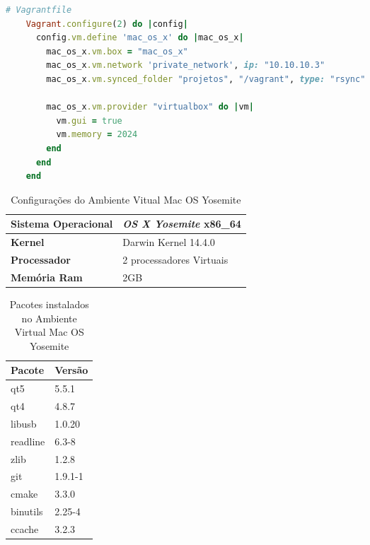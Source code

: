 \begin{itemize}
\begin{lstlisting}[language=ruby, caption={Vagrantfile com configurações da máquina virtual Mac OS Yosemite},
                  label=vagrant_mac_os_x]
    # Vagrantfile
    Vagrant.configure(2) do |config|
      config.vm.define 'mac_os_x' do |mac_os_x|
        mac_os_x.vm.box = "mac_os_x"
        mac_os_x.vm.network 'private_network', ip: "10.10.10.3"
        mac_os_x.vm.synced_folder "projetos", "/vagrant", type: "rsync"

        mac_os_x.vm.provider "virtualbox" do |vm|
          vm.gui = true
          vm.memory = 2024
        end
      end
    end

\end{lstlisting}

\begin{table}[h]
\centering
\begin{tabular}{ll}
\textbf{Sistema Operacional} & \textit{OS X Yosemite} x86\_64  \\ \toprule
\textbf{Kernel} & Darwin Kernel  14.4.0  \\ \midrule 
\textbf{Processador} & 2 processadores Virtuais \\ \midrule
\textbf{Memória Ram} & 2GB  \\ \bottomrule 
\end{tabular} 
\caption{Configurações do Ambiente Vitual Mac OS Yosemite}
\label{especificacoes_mac_os_x}
\end{table}


\begin{table}[h]
\centering
\begin{tabular}{ll}
\textbf{Pacote} & \textbf{Versão} \\ \toprule
qt5 & 5.5.1 \\ \midrule 
qt4 & 4.8.7 \\ \midrule 
libusb & 1.0.20 \\ \midrule 
readline & 6.3-8 \\ \midrule
zlib & 1.2.8 \\ \midrule
git & 1.9.1-1 \\ \midrule
cmake & 3.3.0  \\ \midrule
binutils & 2.25-4 \\ \midrule
ccache & 3.2.3 \\ \bottomrule
\end{tabular} 
\caption{Pacotes instalados no Ambiente Virtual Mac OS Yosemite}
\label{pacotes_instalados_mac_os_x}
\end{table}


\end{itemize}

